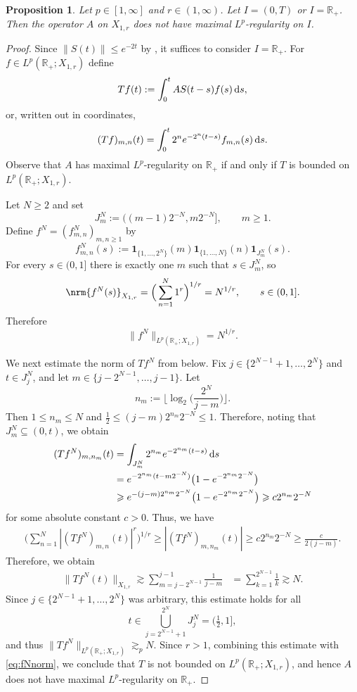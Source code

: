 \documentclass{amsart}
\let\le\leqslant
\let\leq\leqslant
\let\ge\geqslant
\let\geq\geqslant
\theoremstyle{plain}
\theoremstyle{remark}
\theoremstyle{plain}
\newtheorem{proposition}[theorem]{Proposition}
\numberwithin{equation}{section}
\newcommand{\R}{\mathbb R}
\newcommand{\1}{\mathbf 1}
\newcommand{\dd}{\,{\rm d}}
\newcommand{\norm}[1]{\|#1\|}
\DeclarePairedDelimiter{\nrm}\lVert\rVert
\begin{document}
\begin{proposition}\label{prop:MRq=1}
Let $p\in [1, \infty]$ and $r\in (1, \infty)$. Let $I= (0,T)$ or $I = \R_+$. Then the operator $A$ on $X_{1,r}$ does not have maximal $L^p$-regularity on $I$.
\end{proposition}
\begin{proof} 
Since $\|S(t)\|\leq e^{-2t}$ by \cite[Theorem 17.2.24]{HNVW3}, it suffices to consider $I=\R_+$. For $f \in L^p(\R_+;X_{1,r})$ define
\[
        Tf(t):=\int_0^t A S(t-s)f(s)\dd s,
\]
or, written out in coordinates,
\[
        (Tf)_{m,n}(t)=\int_0^t 2^n e^{-2^n(t-s)} f_{m,n}(s)\dd s.
\]
Observe that $A$ has maximal $L^p$-regularity on $\R_+$ if and only if $T$ is bounded on $L^p(\R_+;X_{1,r})$.

Let $N\geq 2$ and set $$J^N_m:=((m-1)2^{-N},m 2^{-N}], \qquad m\geq 1.$$ Define $f^N=(f^N_{m,n})_{m,n\geq 1}$ by
\[
        f^N_{m,n}(s):=\1_{\{1,\ldots,2^N\}}(m)\1_{\{1,\ldots,N\}}(n)\1_{J^N_m}(s).
\]
For every $s\in(0,1]$ there is exactly one $m$ such that $s\in J^N_m$, so
\[
        \nrm{f^N(s)}_{X_{1,r}} = \Big(\sum_{n=1}^N 1^r\Big)^{1/r}    =    N^{1/r},        \qquad s\in(0,1].
\]
Therefore
\begin{equation}\label{eq:fNnorm}
    \norm{f^N}_{L^p(\R_+;X_{1,r})}=N^{1/r}.
\end{equation}

We next estimate the norm of $Tf^N$ from below. Fix
$j\in\{2^{N-1}+1,\ldots,2^N\}$ and $t\in J^N_j$,
and let $m\in\{j-2^{N-1},\ldots,j-1\}$. Let
\[
        n_m:=\Big\lfloor \log_2\Big(\frac{2^N}{j-m}\Big)\Big\rfloor .
\]
Then $1\le n_m\le N$ and $\frac12\leq (j-m) 2^{n_m}2^{-N} \le1$. Therefore, noting that $J_m^N\subseteq(0,t)$, we obtain
\[
\begin{aligned}
        (Tf^N)_{m,n_m}(t) &=\int_{J_m^N}2^{n_m} e^{-2^{n_m}(t-s)}\dd s        \\&=e^{-2^{n_m}(t-m2^{-N})}\bigl(1-e^{-2^{n_m}2^{-N}}\bigr)
        \\&\geq e^{-(j-m) 2^{n_m} 2^{-N}}\bigl(1-e^{-2^{n_m}2^{-N}}\bigr) \ge c  2^{n_m}2^{-N}
\end{aligned}
\]
for some absolute constant $c>0$. Thus, we have
\[
\begin{aligned}
        \Big(\sum_{n=1}^N |(Tf^N)_{m,n}(t)|^r\Big)^{1/r}\geq |(Tf^N)_{m,n_m}(t)|\geq c 2^{n_m}2^{-N}\geq\frac{c}{2(j-m)}.
\end{aligned}
\]
Therefore, we obtain
\[
\begin{aligned}
        \norm{Tf^N(t)}_{X_{1,r}}\gtrsim \sum_{m=j-2^{N-1}}^{j-1}\frac1{j-m}        &=\sum_{k=1}^{2^{N-1}}\frac1k \gtrsim N .
\end{aligned}
\]
Since $j\in\{2^{N-1}+1,\ldots,2^N\}$ was arbitrary, this estimate holds for all $$t \in \bigcup_{j=2^{N-1}+1}^{2^N} J_j^N=(\tfrac12,1],$$ and thus
       $ \norm{Tf^N}_{L^p(\R_+;X_{1,r})}
        \gtrsim_p N.$
Since $r>1$, combining this estimate with \eqref{eq:fNnorm}, we conclude that $T$ is not bounded on $L^p(\R_+;X_{1,r})$, and hence $A$ does not have maximal $L^p$-regularity on $\R_+$.
\end{proof}
\end{document}
